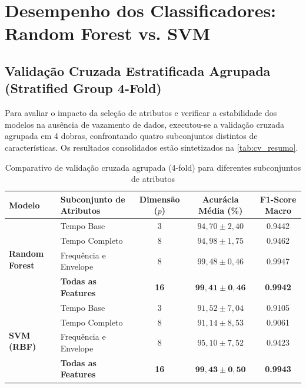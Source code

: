 \section{Desempenho dos Classificadores: Random Forest vs. SVM}
\label{sec:desempenho_modelos}

\subsection{Validação Cruzada Estratificada Agrupada (Stratified Group 4-Fold)}
Para avaliar o impacto da seleção de atributos e verificar a estabilidade dos modelos na ausência de vazamento de dados, executou-se a validação cruzada agrupada em 4 dobras, confrontando quatro subconjuntos distintos de características. Os resultados consolidados estão sintetizados na \autoref{tab:cv_resumo}.

\begin{table}[htbp]
    \centering
    \caption{Comparativo de validação cruzada agrupada (4-fold) para diferentes subconjuntos de atributos}
    \label{tab:cv_resumo}
    \begin{tabular}{llccc}
        \toprule
        \textbf{Modelo} & \textbf{Subconjunto de Atributos} & \textbf{Dimensão ($p$)} & \textbf{Acurácia Média (\%)} & \textbf{F1-Score Macro} \\
        \midrule
        \multirow{4}{*}{\textbf{Random Forest}} 
        & Tempo Base & 3 & $94,70 \pm 2,40$ & \num{0,9442} \\
        & Tempo Completo & 8 & $94,98 \pm 1,75$ & \num{0,9462} \\
        & Frequência e Envelope & 8 & $99,48 \pm 0,46$ & \num{0,9947} \\
        & \textbf{Todas as Features} & \textbf{16} & $\mathbf{99,41 \pm 0,46}$ & \textbf{\num{0,9942}} \\
        \midrule
        \multirow{4}{*}{\textbf{SVM (RBF)}} 
        & Tempo Base & 3 & $91,52 \pm 7,04$ & \num{0,9105} \\
        & Tempo Completo & 8 & $91,14 \pm 8,53$ & \num{0,9061} \\
        & Frequência e Envelope & 8 & $95,10 \pm 7,52$ & \num{0,9423} \\
        & \textbf{Todas as Features} & \textbf{16} & $\mathbf{99,43 \pm 0,50}$ & \textbf{\num{0,9943}} \\
        \bottomrule
    \end{tabular}
\end{table}

